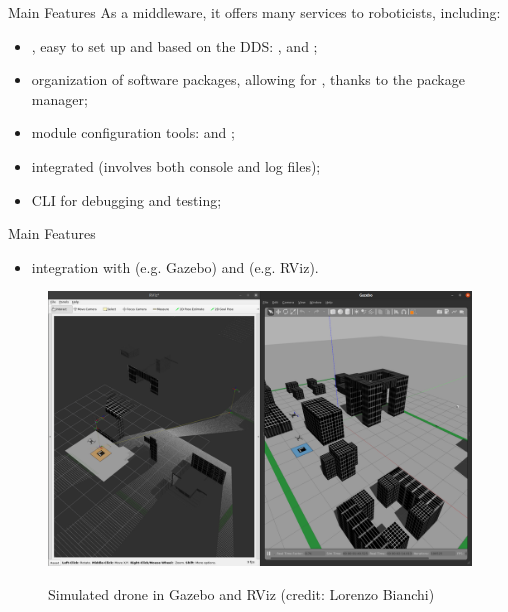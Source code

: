 \begin{frame}{Main Features}
	As a middleware, it offers many services to roboticists, including:
	\begin{itemize}
		\item {}, easy to set up and based on the DDS: ,  and ;
		\item organization of software packages, allowing for , thanks to the  package manager;
		\item module configuration tools:  and ;
		\item integrated  (involves both console and log files);
		\item CLI  for debugging and testing;
	\end{itemize}
\end{frame}
\begin{frame}{Main Features}
  \begin{itemize}
    \item integration with  (e.g. Gazebo) and  (e.g. RViz).
  \end{itemize}
  \begin{figure}
    \centering
    \includegraphics[scale=.147]{simulation.png}
    \label{fig:sim}
    \caption{Simulated drone in Gazebo and RViz (credit: Lorenzo Bianchi)}
  \end{figure}
\end{frame}

